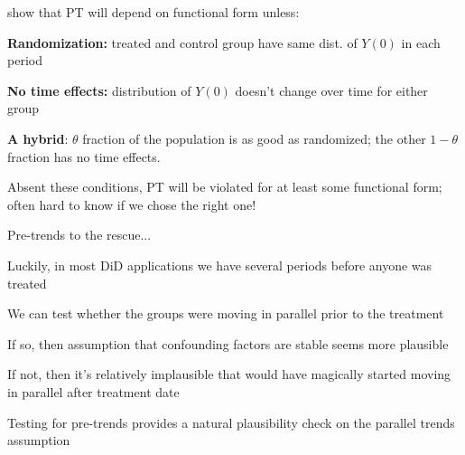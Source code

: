 \documentclass[aspectratio = 169, 13pt]{beamer}
\begin{document}
\begin{frame}{}
	
	\citet{roth_when_2021} show that PT will depend on functional form unless: \medskip 
	\begin{wideitemize}
		\item
		\textbf{Randomization:} treated and control group have same dist. of $Y(0)$ in each period
		
		\item
		\textbf{No time effects:} distribution of $Y(0)$ doesn't change over time for either group
		
		\item
		\textbf{A hybrid}: $\theta$ fraction of the population is as good as randomized; the other $1-\theta$ fraction has no time effects. 
	\end{wideitemize}
	\bigskip 
	Absent these conditions, PT will be violated for at least some functional form; often hard to know if we chose the right one!
\end{frame}


\begin{frame}{Pre-trends to the rescue...}
	\begin{wideitemize}
		\item
		Luckily, in most DiD applications we have several periods before anyone was treated
		
		\item
		We can test whether the groups were moving in parallel prior to the treatment
		\begin{wideitemize}
			\item
			If so, then assumption that confounding factors are stable seems more plausible
			
			\item
			If not, then it's relatively implausible that would have magically started moving in parallel after treatment date
		\end{wideitemize}
		
		\item
		Testing for pre-trends provides a natural plausibility check on the parallel trends assumption
	\end{wideitemize}
\end{frame}
\end{document}
